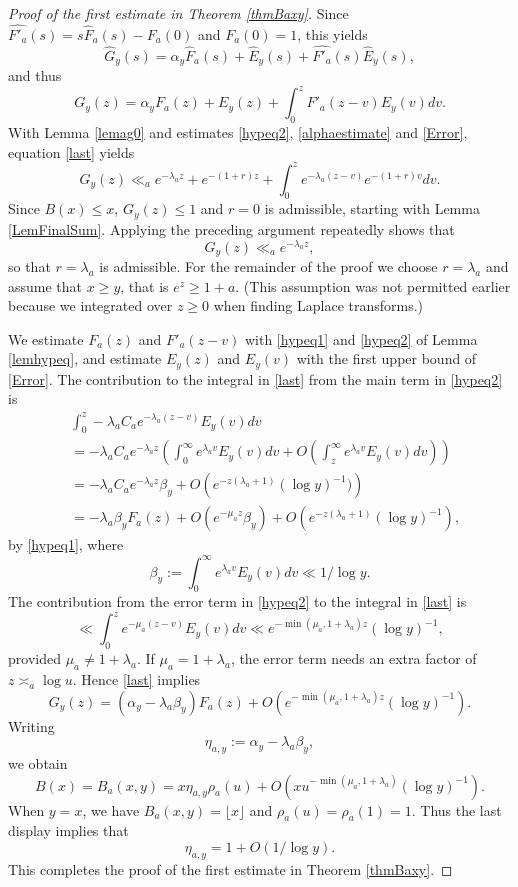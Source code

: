 \documentclass[11pt]{amsart}
\begin{document}
\begin{proof}[Proof of the first estimate in Theorem \ref{thmBaxy}]
Since $\widehat{F'_a}(s)=s\widehat{F}_a(s)-F_a(0)$ and $F_a(0)=1$, this yields
$$    \widehat{G}_y(s) = \alpha_y \widehat{F}_a(s) + \widehat{E}_y(s) +\widehat{F'_a}(s) \widehat{E}_y(s),$$
and thus
\begin{equation}\label{last}
G_y(z)= \alpha_y F_a(z) + E_y(z) + \int_0^z F'_a(z-v) E_y(v) dv.
\end{equation}
With Lemma \ref{lemag0} and estimates \eqref{hypeq2}, \eqref{alphaestimate} and \eqref{Error}, equation \eqref{last} yields
$$
G_y(z) \ll_a e^{-\lambda_a z} + e^{-(1+r)z} + \int_0^z e^{-\lambda_a(z-v)} e^{-(1+r)v} dv.
$$
Since $B(x) \le x$, $G_y(z) \le 1$ and $r=0$ is admissible, starting with Lemma \ref{LemFinalSum}. 
Applying the preceding argument repeatedly shows that 
$$
G_y(z) \ll_a e^{-\lambda_a z},
$$
so that $r=\lambda_a$ is admissible. 
For the remainder of the proof we choose $r=\lambda_a$ and assume that $x\ge y$, that is $e^z \ge 1+a$. 
(This assumption was 
not permitted earlier because we integrated over $z\ge 0$ when finding Laplace transforms.)

We estimate $F_a(z)$ and $F'_a(z-v)$ with \eqref{hypeq1} and \eqref{hypeq2} of Lemma \ref{lemhypeq}, and estimate $E_y(z)$ and $E_y(v)$ with
 the first upper bound of \eqref{Error}.
The contribution to the integral in \eqref{last} from the main term in \eqref{hypeq2} is
\begin{equation*}
\begin{split}
& \int_0^z -\lambda_a C_a  e^{-\lambda_a (z-v)} E_y(v) dv \\
&=  -\lambda_a C_a   e^{-\lambda_a z} \left(  \int_0^\infty e^{\lambda_a v} E_y(v) dv 
+ O\left( \int_z^\infty e^{\lambda_a v}E_y(v) dv \right) \right) \\
&= -\lambda_a C_a     e^{-\lambda_a z}\beta_y + O\left(e^{-z(\lambda_a+1)}(\log y)^{-1})\right) \\
& = -\lambda_a \beta_y F_a(z) + O(e^{-\mu_a z}\beta_y) + O\left(e^{-z(\lambda_a+1)}(\log y)^{-1}\right),
\end{split}
\end{equation*}
by \eqref{hypeq1}, where
 $$\beta_y :=  \int_0^\infty e^{\lambda_a v} E_y(v) dv  \ll 1/\log y . $$
The contribution from the error term in \eqref{hypeq2} to the integral in \eqref{last} is
$$
\ll \int_0^z e^{-\mu_a(z-v)} E_y(v) dv 
\ll e^{-\min(\mu_a,1+\lambda_a) z}  (\log y)^{-1} ,
$$
provided $\mu_a \neq 1+\lambda_a$. If  $\mu_a = 1+\lambda_a$, the error term needs an extra factor of $z \asymp_a \log u$.
Hence \eqref{last} implies 
$$ G_y(z)= (\alpha_y - \lambda_a \beta_y) F_a(z) + O(e^{-\min(\mu_a,1+\lambda_a) z}  (\log y)^{-1} ).
$$
Writing
$$
\eta_{a,y}:=\alpha_y - \lambda_a \beta_y,
$$
we obtain
$$
B(x) = B_a(x,y) = x\eta_{a,y} \rho_a(u) + O(x u^ {-\min(\mu_a,1+\lambda_a) }(\log y)^{-1} ).
$$
When $y=x$, we have $B_a(x,y)= \lfloor x \rfloor$ and $\rho_a(u)=\rho_a(1)=1$. Thus the last display implies that
$$
\eta_{a,y}=1+O(1/\log y).
$$
This completes the proof of the first estimate in Theorem \ref{thmBaxy}.
\end{proof}
\end{document}
